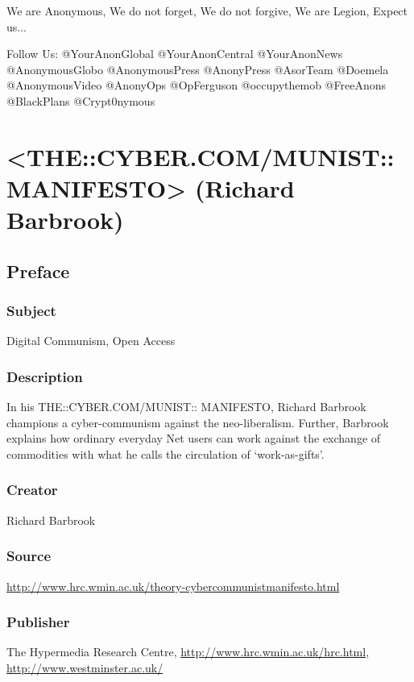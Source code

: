 \documentclass[letterpaper,12pt,english]{sphinxmanual}
\begin{document}
We are Anonymous,
We do not forget,
We do not forgive,
We are Legion,
Expect us...

Follow Us: @YourAnonGlobal @YourAnonCentral @YourAnonNews @AnonymousGlobo @AnonymousPress @AnonyPress @AsorTeam @Doemela @AnonymousVideo
@AnonyOps @OpFerguson @occupythemob @FreeAnons @BlackPlans @Crypt0nymous


\chapter{\textless{}THE::CYBER.COM/MUNIST::MANIFESTO\textgreater{} (Richard Barbrook)}
\label{cybercommunist::doc}\label{cybercommunist:the-cyber-com-munist-manifesto-richard-barbrook}

\section{Preface}
\label{cybercommunist:preface}

\subsection{Subject}
\label{cybercommunist:subject}
Digital Communism, Open Access


\subsection{Description}
\label{cybercommunist:description}
In his THE::CYBER.COM/MUNIST:: MANIFESTO, Richard Barbrook champions a cyber-communism against the neo-liberalism. Further, Barbrook explains how ordinary everyday Net users can work against the exchange of commodities with what he calls the circulation of `work-as-gifts'.


\subsection{Creator}
\label{cybercommunist:creator}
Richard Barbrook


\subsection{Source}
\label{cybercommunist:source}
\url{http://www.hrc.wmin.ac.uk/theory-cybercommunistmanifesto.html}


\subsection{Publisher}
\label{cybercommunist:publisher}
The Hypermedia Research Centre, \url{http://www.hrc.wmin.ac.uk/hrc.html}, \url{http://www.westminster.ac.uk/}
\end{document}
